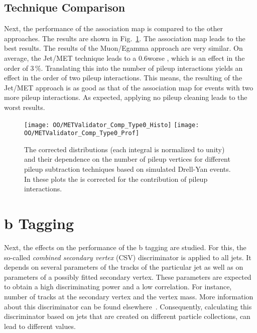 \subsection{Technique Comparison \label{sec:OOMetComp}}

Next, the performance of the association map is compared to the other approaches. The results are shown in Fig.~\ref{plot:OOMetComp}. The association map leads to the best results. The results of the Muon/Egamma approach are very similar. On average, the Jet/MET technique leads to a 0.6\GeV worse \MET{}, which is an effect in the order of $3\,\%$. Translating this into the number of pileup interactions yields an effect in the order of two pileup interactions. This means, the resulting \MET{} of the Jet/MET approach is as good as that of the association map for events with two more pileup interactions. As expected, applying no pileup cleaning leads to the worst results.

\begin{figure}[h!t]
  \centering
  \texttt{[image: OO/METValidator\_Comp\_Type0\_Histo]}
  \texttt{[image: OO/METValidator\_Comp\_Type0\_Prof]}
  \caption[The corrected \MET{} distributions and their dependence on the number of pileup vertices for different pileup subtraction techniques based on simulated Drell-Yan events]{The corrected \MET{} distributions (each integral is normalized to unity) and their dependence on the number of pileup vertices for different pileup subtraction techniques based on simulated Drell-Yan events. In these plots the \MET{} is corrected for the contribution of pileup interactions. \label{plot:OOMetComp}}
\end{figure}

\section{b Tagging \label{sec:OOBTag}}

Next, the effects on the performance of the b tagging are studied. For this, the so-called \textit{combined secondary vertex} (CSV) discriminator is applied to all jets. It depends on several parameters of the tracks of the particular jet as well as on parameters of a possibly fitted secondary vertex. These parameters are expected to obtain a high discriminating power and a low correlation. For instance, number of tracks at the secondary vertex and the vertex mass. More information about this discriminator can be found elsewhere~\cite{Chatrchyan:2012jua}. Consequently, calculating this discriminator based on jets that are created on different particle collections, can lead to different values.

